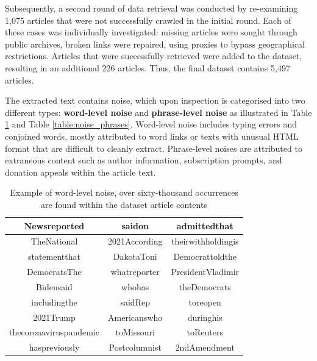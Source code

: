 Subsequently, a second round of data retrieval was conducted by re-examining 1,075 articles that were not successfully crawled in the initial round. Each of these cases was individually investigated: missing articles were sought through public archives, broken links were repaired, using proxies to bypass geographical restrictions. Articles that were successfully retrieved were added to the dataset, resulting in an additional 226 articles. Thus, the final dataset contains 5,497 articles.

The extracted text contains noise, which upon inspection is categorised into two different types: \textbf{word-level noise} and \textbf{phrase-level noise} as illustrated in Table \ref{table:conjoined_words} and Table \ref{table:noise_phrases}. Word-level noise includes typing errors and conjoined words, mostly attributed to word links or texts with unusual HTML format that are difficult to cleanly extract. Phrase-level noises are attributed to extraneous content such as author information, subscription prompts, and donation appeals within the article text.

\begin{table}[htbp]
    \centering
    \small
    \begin{tabular}{| c | c | c |}
        \hline
        Newsreported           & saidon        & admittedthat       \\
        \hline
        TheNational            & 2021According & theirwithholdingis \\
        \hline
        statementthat          & DakotaToni    & Democrattoldthe    \\
        \hline
        DemocratsThe           & whatreporter  & PresidentVladimir  \\
        \hline
        Bidensaid              & whohas        & theDemocrats       \\
        \hline
        includingthe           & saidRep       & toreopen           \\
        \hline
        2021Trump              & Americanswho  & duringhis          \\
        \hline
        thecoronaviruspandemic & toMissouri    & toReuters          \\
        \hline
        haspreviously          & Postcolumnist & 2ndAmendment       \\
        \hline
    \end{tabular}
    \caption{Example of word-level noise, over sixty-thousand occurrences are found within the dataset article contents}
    \label{table:conjoined_words}
\end{table}

